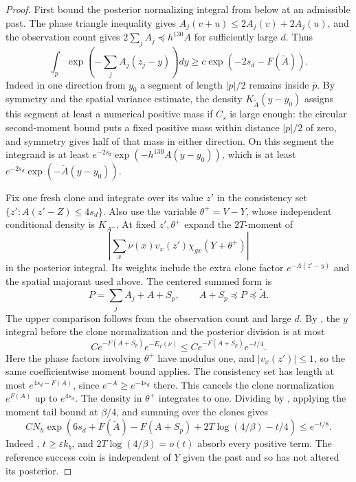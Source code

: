 \begin{proof}
First bound the posterior normalizing integral from below at an
admissible past.  The phase triangle inequality gives
$A_j(v+u)\le2A_j(v)+2A_j(u)$, and the observation count gives
$2\sum_jA_j\preceq h^{130}A$ for sufficiently large $d$.
Thus
\begin{equation}\label{eq:thermal-posterior-denominator}
 \int_p\exp\left(-\sum_jA_j(z_j-y)\right)dy
 \ge c\exp(-2s_d-F(\widetilde A)).
\end{equation}
Indeed in one direction from $y_0$ a segment of length $|p|/2$ remains
inside $\overline p$.  By symmetry and the spatial variance estimate,
the density $K_{\widetilde A}(y-y_0)$ assigns this segment at least a
numerical positive mass if $C_s$ is large enough: the circular
second-moment bound puts a fixed positive mass within distance $|p|/2$
of zero, and symmetry gives half of that mass in either direction.
On this segment the
integrand is at least
$e^{-2s_d}\exp(-h^{130}A(y-y_0))$, which is at least
$e^{-2s_d}\exp(-\widetilde A(y-y_0))$.

Fix one fresh clone and integrate over its value $z'$ in the
consistency set $\{z':A(z'-Z)\le4s_d\}$.  Also use the variable
$\theta^+=V-Y$, whose independent conditional density is $K_{A^+}$.
At fixed $z',\theta^+$ expand the $2T$-moment of
\[
 \left|\sum_x\nu(x)v_x(z')\chi_{gx}(Y+\theta^+)\right|
\]
in the posterior integral.  Its weights include the extra clone
factor $e^{-A(z'-y)}$ and the spatial majorant used above.  The centered
summed form is
\[
 P=\sum_jA_j+A+S_p,
 \qquad A+S_p\preceq P\preceq\widetilde A.
\]
The upper comparison follows from the observation count and large $d$.
By , the $y$ integral before the clone
normalization and the posterior division is at most
\[
 Ce^{-F(A+S_p)}e^{-E_T(\nu)}
 \le Ce^{-F(A+S_p)}e^{-t/4}.
\]
Here the phase factors involving $\theta^+$ have modulus one, and
$|v_x(z')|\le1$, so the same coefficientwise moment bound applies.
The consistency set has length at most $e^{4s_d-F(A)}$, since
$e^{-A}\ge e^{-4s_d}$ there.  This cancels the clone normalization
$e^{F(A)}$ up to $e^{4s_d}$.  The density in $\theta^+$ integrates
to one.  Dividing by , applying
the moment tail bound at $\beta/4$, and summing over the clones gives
\[
 C N_h\exp\left(
 6s_d+F(\widetilde A)-F(A+S_p)
       +2T\log(4/\beta)-t/4\right)\le e^{-t/8}.
\]
Indeed , $t\ge\varepsilon k_b$, and
$2T\log(4/\beta)=o(t)$ absorb every positive term.  The reference
success coin is independent of $Y$ given the past and so has not
altered its posterior.


\end{proof}
